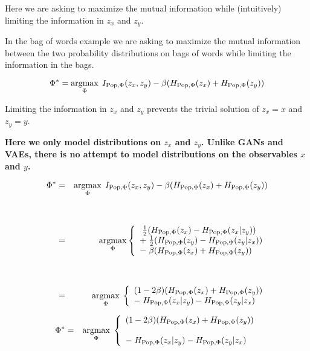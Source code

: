 {\vfill
Here we are asking to maximize the mutual information while (intuitively) limiting the information in $z_x$ and $z_y$.

\vfill
In the bag of words example we are asking to maximize the mutual information between the two probability distributions on bags of words while limiting the information in the bags.


$$\Phi^* = \operatorname*{argmax}_{\Phi} \; I_{\mathrm{Pop},\Phi}(z_x,z_y) - \beta (H_{\mathrm{Pop},\Phi}(z_x) + H_{\mathrm{Pop},\Phi}(z_y))$$

\vfill
Limiting the information in $z_x$ and $z_y$ prevents the trivial solution of $z_x = x$ and $z_y = y$.

\vfill
{\bf Here we only model distributions on $z_x$ and $z_y$.  Unlike GANs and VAEs, there is no attempt to model distributions on the observables $x$ and $y$.}


\begin{eqnarray*}
\Phi^* & = & \operatorname*{argmax}_{\Phi} \; I_{\mathrm{Pop},\Phi}(z_x,z_y) - \beta (H_{\mathrm{Pop},\Phi}(z_x) + H_{\mathrm{Pop},\Phi}(z_y)) \\
\\
\\
 & = & \operatorname*{argmax}_{\Phi} \left\{\begin{array}{l}\; \frac{1}{2}(H_{\mathrm{Pop},\Phi}(z_x) - H_{\mathrm{Pop},\Phi}(z_x|z_y)) \\
                                              +\;\frac{1}{2}(H_{\mathrm{Pop},\Phi}(z_y) - H_{\mathrm{Pop},\Phi}(z_y|z_x)) \\
                                              - \;\beta (H_{\mathrm{Pop},\Phi}(z_x) + H_{\mathrm{Pop},\Phi}(z_y)) \end{array}\right. \\
\\
\\
 & = & \operatorname*{argmax}_{\Phi} \; \left\{\begin{array}{l}(1-2\beta)(H_{\mathrm{Pop},\Phi}(z_x)+ H_{\mathrm{Pop},\Phi}(z_y)) \\ -\; H_{\mathrm{Pop},\Phi}(z_x|z_y) - H_{\mathrm{Pop},\Phi}(z_y|z_x) \end{array}\right.
\end{eqnarray*}


\begin{eqnarray*}
\Phi^* & = & \operatorname*{argmax}_{\Phi} \; \left\{\begin{array}{l}(1-2\beta)(H_{\mathrm{Pop},\Phi}(z_x)+ H_{\mathrm{Pop},\Phi}(z_y)) \\
\\
-\; H_{\mathrm{Pop},\Phi}(z_x|z_y) - H_{\mathrm{Pop},\Phi}(z_y|z_x) \end{array}\right.
\end{eqnarray*}

}
